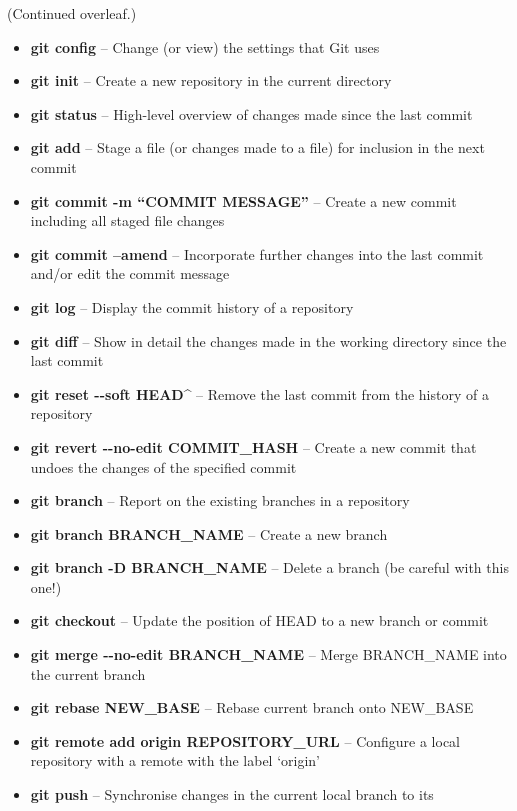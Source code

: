\documentclass[9pt]{extarticle}
\def\itempad{-1pt}
\begin{document}
(Continued overleaf.)

\begin{bluebox}[title=Git Command Cheat Sheet]
  \begin{itemize}
    \itemsep\itempad
  \item \textbf{git config} -- Change (or view) the settings that Git uses
  \item \textbf{git init} -- Create a new repository in the current directory
  \item \textbf{git status} -- High-level overview of changes made since the last commit
  \item \textbf{git add} -- Stage a file (or changes made to a file) for inclusion in
    the next commit
  \item \textbf{git commit -m ``COMMIT MESSAGE''} -- Create a new commit including all
    staged file changes
  \item \textbf{git commit --amend} -- Incorporate further changes into the last commit
    and/or edit the commit message
  \item \textbf{git log} -- Display the commit history of a repository
  \item \textbf{git diff} -- Show in detail the changes made in the working directory
    since the last commit
  \item \textbf{git reset -{}-soft HEAD\^} -- Remove the last commit from the history of
    a repository
  \item \textbf{git revert -{}-no-edit COMMIT\_HASH} -- Create a new commit that undoes
    the changes of the specified commit
  \item \textbf{git branch} -- Report on the existing branches in a repository
  \item \textbf{git branch BRANCH\_NAME} -- Create a new branch
  \item \textbf{git branch -D BRANCH\_NAME} -- Delete a branch (be careful with this one!)
  \item \textbf{git checkout} -- Update the position of HEAD to a new branch or commit
  \item \textbf{git merge -{}-no-edit BRANCH\_NAME} -- Merge BRANCH\_NAME into the
    current branch
  \item \textbf{git rebase NEW\_BASE} -- Rebase current branch onto NEW\_BASE
  \item \textbf{git remote add origin REPOSITORY\_URL} -- Configure a local repository
    with a remote with the label `origin'
  \item \textbf{git push} -- Synchronise changes in the current local branch to its

\end{itemize}
\end{bluebox}
\end{document}
